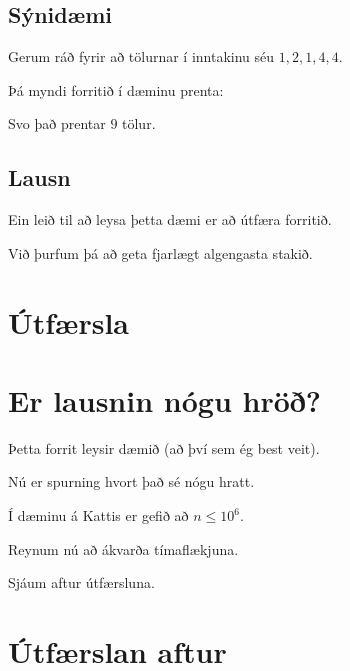 \subsection{Sýnidæmi}
{
    {
        \item<1-> Gerum ráð fyrir að tölurnar í inntakinu séu $1, 2, 1, 4, 4$.
        \item<2-> Þá myndi forritið í dæminu prenta:
        \item<3->[] 
        \item<4-> Svo það prentar $9$ tölur.
    }
}

\subsection{Lausn}
{
    {
        \item<1-> Ein leið til að leysa þetta dæmi er að útfæra forritið.
        \item<2-> Við þurfum þá að geta fjarlægt algengasta stakið.
    }
}

\section{Útfærsla}
{
}

\section{Er lausnin nógu hröð?}
{
    {
        \item<1-> Þetta forrit leysir dæmið (að því sem ég best veit).
        \item<2-> Nú er spurning hvort það sé nógu hratt.
        \item<3-> Í dæminu á Kattis er gefið að $n \leq 10^6$.
        \item<4-> Reynum nú að ákvarða tímaflækjuna.
        \item<5-> Sjáum aftur útfærsluna.
    }
}

\section{Útfærslan aftur}
{
}

